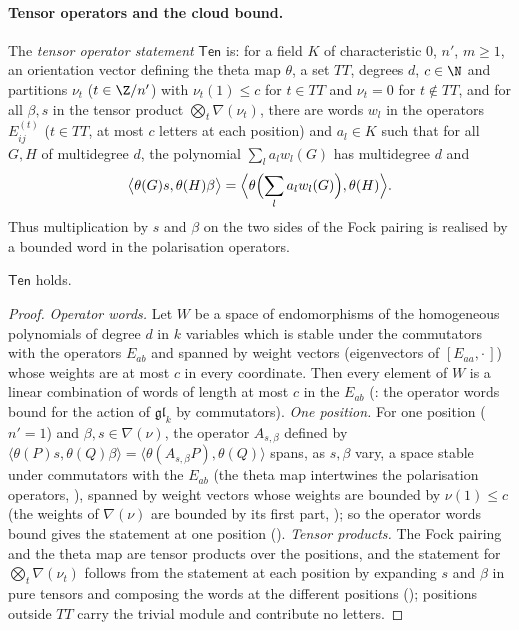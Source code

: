 \paragraph{Tensor operators and the cloud bound.}
The \emph{tensor operator statement} $\mathsf{Ten}$ is: for a field $K$ of characteristic $0$, $n'$, $m\ge1$, an orientation
vector defining the theta map $\theta$, a set $TT$, degrees
$d$, $c\in\N$ and partitions $\nu_t$ ($t\in\Z/n'$) with $\nu_t(1)\le c$ for $t\in TT$ and $\nu_t=0$ for $t\notin TT$, and for all
$\beta,s$ in the tensor product $\bigotimes_t\nabla(\nu_t)$, there are words $w_l$ in the operators $E^{(t)}_{ij}$ ($t\in TT$,
at most $c$ letters at each position) and $a_l\in K$ such that for all $G,H$ of multidegree $d$, the polynomial
$\sum_la_lw_l(G)$ has multidegree $d$ and
\[
\bigl\langle\theta(G)s,\theta(H)\beta\bigr\rangle=\Bigl\langle\theta\Bigl(\sum_la_lw_l(G)\Bigr),\theta(H)\Bigr\rangle .
\]
Thus multiplication by $s$ and $\beta$ on the two sides of the Fock pairing is realised by a bounded word in the
polarisation operators.

\begin{proposition}\label{pf:linkG:tenop}
$\mathsf{Ten}$ holds.
\end{proposition}

\begin{proof}
\emph{Operator words.} Let $W$ be a space of endomorphisms of the homogeneous polynomials of degree $d$ in $k$ variables
which is stable under the commutators with the operators $E_{ab}$ and spanned by weight vectors (eigenvectors of
$[E_{aa},\cdot\,]$) whose weights are at most $c$ in every coordinate. Then every element of $W$ is a linear combination of
words of length at most $c$ in the $E_{ab}$ (: the operator words bound for the action
of $\mathfrak{gl}_k$ by commutators). \emph{One position.} For one position ($n'=1$) and $\beta,s\in\nabla(\nu)$, the operator
$A_{s,\beta}$ defined by $\langle\theta(P)s,\theta(Q)\beta\rangle=\langle\theta(A_{s,\beta}P),\theta(Q)\rangle$ spans, as
$s,\beta$ vary, a space stable under commutators with the $E_{ab}$ (the theta map intertwines the polarisation operators,
), spanned by weight vectors whose weights are bounded by
$\nu(1)\le c$ (the weights of $\nabla(\nu)$ are bounded by its first part,
); so the operator words bound gives the statement
at one position (). \emph{Tensor products.} The Fock pairing and
the theta map are tensor products over the positions, and the statement for $\bigotimes_t\nabla(\nu_t)$ follows from the
statement at each position by expanding $s$ and $\beta$ in pure tensors and composing the words at the different positions
(); positions outside $TT$ carry the trivial
module and contribute no letters.
\end{proof}

